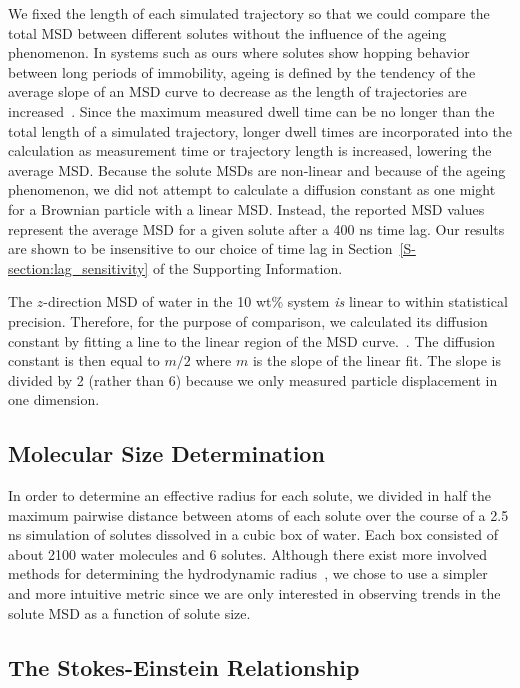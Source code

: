 \documentclass[journal=jpcbfk,manuscript=article]{achemso}
\begin{document}
  We fixed the length of each simulated trajectory so that we could compare the total
  MSD between different solutes without the influence of the ageing phenomenon.
  In systems such as ours where solutes show hopping behavior between long periods 
  of immobility, ageing is defined by the tendency of the average slope of an MSD 
  curve to decrease as the length of trajectories are increased~\cite{metzler_anomalous_2014}.
  Since the maximum measured dwell time can be no longer than the total length of a simulated
  trajectory, longer dwell times are incorporated into the calculation as measurement
  time or trajectory length is increased, lowering the average MSD. Because the solute 
  MSDs are non-linear and because of the ageing phenomenon, we did not attempt to calculate
  a diffusion constant as one might for a Brownian particle with a linear MSD. Instead,
  the reported MSD values represent the average MSD for a given	solute after a 400
  ns time lag. Our results are shown to be insensitive to our choice of time lag in 
  Section~\ref{S-section:lag_sensitivity} of the Supporting Information.
  
  The $z$-direction MSD of water in the 10 wt\% system \textit{is} linear to within 
  statistical precision. Therefore, for the purpose of comparison, we calculated its
  diffusion constant by fitting a line to the linear region of the MSD curve.~\cite{maginn_best_2018}. The diffusion constant
  is then equal to $m/2$ where $m$ is the slope of the linear fit. The slope is divided
  by 2 (rather than 6) because we only measured particle displacement in one dimension.

  \subsection{Molecular Size Determination}\label{method:molecular_size}
  
  In order to determine an effective radius for each solute, we divided in 
  half the maximum pairwise distance between atoms of each solute over the course of
  a 2.5 ns simulation of solutes dissolved in a cubic box of water. Each box 
  consisted of about 2100 water molecules and 6 solutes. Although there exist
  more involved methods for determining the hydrodynamic radius~\cite{schultz_determination_1961},
  we chose to use a simpler and more intuitive metric since we are only interested
  in observing trends in the solute MSD as a function
  of solute size.
  
  \subsection{The Stokes-Einstein Relationship}\label{method:stokes}
  
\end{document}
